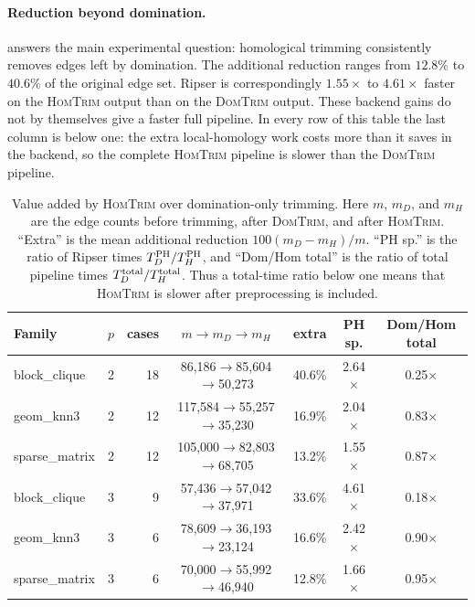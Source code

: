 \documentclass[11pt,letterpaper]{article}
\theoremstyle{definition}
\begin{document}
\paragraph{Reduction beyond domination.}
 answers the main experimental question:
homological trimming consistently removes edges left by domination. The
additional reduction ranges from $12.8\%$ to $40.6\%$ of the original edge
set. Ripser is correspondingly $1.55\times$ to $4.61\times$ faster on the
\textsc{HomTrim} output than on the \textsc{DomTrim} output. These backend
gains do not by themselves give a faster full pipeline. In every row of this
table the last column is below one: the extra local-homology work costs more
than it saves in the backend, so the complete \textsc{HomTrim} pipeline is
slower than the \textsc{DomTrim} pipeline.

\begin{table}[ht]
\centering
\scriptsize
\setlength{\tabcolsep}{3.8pt}
\renewcommand{\arraystretch}{1.0}
\begin{tabular}{llrcccc}
\toprule
Family & \(p\) & cases & \(m\to m_D\to m_H\) & extra & PH sp. & Dom/Hom total \\
\midrule
block\_clique & 2 & 18 & 86,186\(\to\)85,604\(\to\)50,273 & 40.6\% & 2.64\(\times\) & 0.25\(\times\) \\
geom\_knn3 & 2 & 12 & 117,584\(\to\)55,257\(\to\)35,230 & 16.9\% & 2.04\(\times\) & 0.83\(\times\) \\
sparse\_matrix & 2 & 12 & 105,000\(\to\)82,803\(\to\)68,705 & 13.2\% & 1.55\(\times\) & 0.87\(\times\) \\
block\_clique & 3 & 9 & 57,436\(\to\)57,042\(\to\)37,971 & 33.6\% & 4.61\(\times\) & 0.18\(\times\) \\
geom\_knn3 & 3 & 6 & 78,609\(\to\)36,193\(\to\)23,124 & 16.6\% & 2.42\(\times\) & 0.90\(\times\) \\
sparse\_matrix & 3 & 6 & 70,000\(\to\)55,992\(\to\)46,940 & 12.8\% & 1.66\(\times\) & 0.95\(\times\) \\
\bottomrule
\end{tabular}
\caption{Value added by \textsc{HomTrim} over domination-only trimming.
Here $m$, $m_D$, and $m_H$ are the edge counts before trimming, after
\textsc{DomTrim}, and after \textsc{HomTrim}. ``Extra'' is the mean additional
reduction $100(m_D-m_H)/m$. ``PH sp.'' is the ratio of Ripser times
$T_D^{\rm PH}/T_H^{\rm PH}$, and ``Dom/Hom total'' is the ratio of total
pipeline times $T_D^{\rm total}/T_H^{\rm total}$. Thus a total-time ratio below
one means that \textsc{HomTrim} is slower after preprocessing is included.}
\label{tab:value-add-compact}
\end{table}
\end{document}
